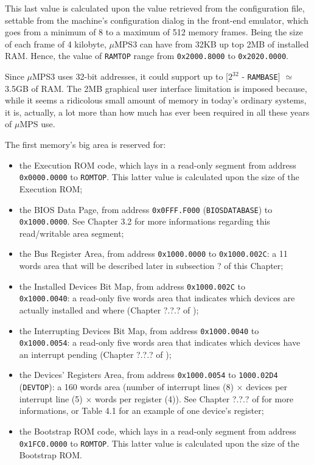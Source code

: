 \documentclass[12pt,a4paper,openright,twoside]{report}
\begin{document}
	This last value is calculated upon the value retrieved from the configuration file, settable from the machine's configuration dialog in the front-end emulator, which goes from a minimum of 8 to a maximum of 512 memory frames.
	Being the size of each frame of 4 kilobyte, $\mu$MPS3 can have from 32KB up top 2MB of installed RAM.
	Hence, the value of \texttt{RAMTOP} range from \texttt{0x2000.8000} to \texttt{0x2020.0000}.
	
	Since $\mu$MPS3 uses 32-bit addresses, it could support up to [$2^{32}$ - \texttt{RAMBASE}] $\simeq$ 3.5GB of RAM.
	The 2MB graphical user interface limitation is imposed because, while it seems a ridicolous small amount of memory in today's ordinary systems, it is, actually, a lot more than how much has ever been required in all these years of $\mu$MPS use.

	The first memory's big area is reserved for:
	\begin{itemize}  
	\item the Execution ROM code, which lays in a read-only segment from address \texttt{0x0000.0000} to \texttt{ROMTOP}. This latter value is calculated upon the size of the Execution ROM;
	\item the BIOS Data Page, from address \texttt{0x0FFF.F000} (\texttt{BIOSDATABASE}) to \texttt{0x1000.0000}. See Chapter 3.2 for more informations regarding this read/writable area segment;
	\item the Bus Register Area, from address \texttt{0x1000.0000} to \texttt{0x1000.002C}: a 11 words area that will be described later in subsection ? of this Chapter;
	\item the Installed Devices Bit Map, from address \texttt{0x1000.002C} to \\ \texttt{0x1000.0040}: a read-only five words area that indicates which devices are actually installed and where (Chapter ?.?.? of \cite{pops});
	\item the Interrupting Devices Bit Map, from address \texttt{0x1000.0040} to \\ \texttt{0x1000.0054}: a read-only five words area that indicates which devices have an interrupt pending (Chapter ?.?.? of \cite{pops});
  \item the Devices' Registers Area, from address \texttt{0x1000.0054} to \texttt{1000.02D4} (\texttt{DEVTOP}): a 160 words area (number of interrupt lines (8) $\times$ devices per interrupt line (5) $\times$  words per register (4)). See Chapter ?.?.? of \cite{pops} for more informations, or Table 4.1 for an example of one device's register;
  \item the Bootstrap ROM code, which lays in a read-only segment from address \texttt{0x1FC0.0000} to \texttt{ROMTOP}. This latter value is calculated upon the size of the Bootstrap ROM.
	\end{itemize}
	
\end{document}
